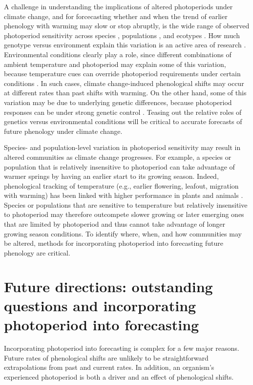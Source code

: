 \documentclass{article}
\begin{document}
 \par A challenge in understanding the implications of altered photoperiods under climate change, and for forcecasting whether and when the trend of earlier phenology with warming may slow or stop abruptly, is the wide range of observed photoperiod sensitivity across species \citep{flynn2018,Sanz-Perez:2009aa, zohner2016}, populations \citep{tanino2010}, and ecotypes \citep{Howe:1995aa}. How much genotype versus environment explain this variation is an active area of research \citep[e.g.,][]{franks2014,gould2010,mimura2010,frejaville2019}. Environmental conditions clearly play a role, since different combinations of ambient temperature and photoperiod may explain some of this variation, because temperature cues can override photoperiod requirements under certain conditions \citep [e.g.,][] {tanino2010}. In such cases, climate change-induced phenological shifts may occur at different rates than past shifts with warming. On the other hand, some of this variation may be due to underlying genetic differences, because photoperiod responses can be under strong genetic control \citep[][, see also Box 1]{bradshaw1995,keller2011,weih2004}. Teasing out the relative roles of genetics versus environmental conditions will be critical to accurate forecasts of future phenology under climate change.

\par Species- and population-level variation in photoperiod sensitivity may result in altered communities as climate change progresses. For example, a species or population that is relatively insensitive to photoperiod can take advantage of warmer springs by having an earlier start to its growing season. Indeed, phenological tracking of temperature (e.g., earlier flowering, leafout, migration with warming) has been linked with higher performance in plants and animals \citep{cleland2012,muir1994,willis2010}. Species or populations that are sensitive to temperature but relatively insensitive to photoperiod may therefore outcompete slower growing or later emerging ones that are limited by photoperiod and thus cannot take advantage of longer growing season conditions. To identify where, when, and how communities may be altered, methods for incorporating photoperiod into forecasting future phenology are critical. 
\section*{Future directions: outstanding questions and incorporating photoperiod into forecasting}
\par  Incorporating photoperiod into forecasting is complex for a few major reasons. Future rates of phenological shifts are unlikely to be straightforward extrapolations from past and current rates. In addition, an organism's experienced photoperiod is both a driver and an effect of phenological shifts. 
\end{document}
